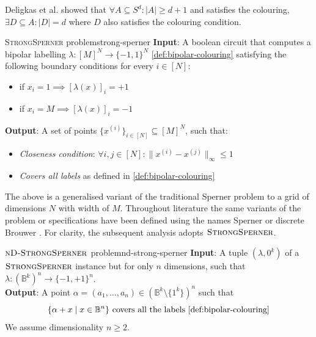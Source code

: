 Deligkas et al. \cite{deligkas_PureCircuitTightInapproximability_2024, deligkas_ConstantInapproximabilityPPA_2022} showed that
$\forall A \subseteq S^d: |A| \geq d+1$ and satisfies the colouring, $\exists D \subseteq A: |D| = d$ where $D$ also satisfies
the colouring condition.

\begin{definitionbox}{\textsc{StrongSperner} problem}{strong-sperner}
    \textbf{Input}: A boolean circuit that computes a bipolar labelling $\lambda: [M]^N \to \{-1, 1\}^N$ \ref{def:bipolar-colouring}
    satisfying the following boundary conditions for every $i \in [N]$:
    \begin{itemize}
        \item if $x_i = 1 \implies [\lambda(x)]_i = +1$
        \item if $x_i = M \implies [\lambda(x)]_i = -1$
    \end{itemize}
    \textbf{Output}: A set of points $\{x^{(i)}\}_{i \in [N]} \subseteq [M]^{N}$, such that:
    \begin{itemize}
        \item \textit{Closeness condition}: $\forall i,j \in [N]: \|x^{(i)} - x^{(j)}\|_{\infty} \leq 1$
        \item \textit{Covers all labels} as defined in \ref{def:bipolar-colouring}
    \end{itemize}
\end{definitionbox}

The above is a generalised variant of the traditional Sperner problem to
a grid of dimensions $N$ with width of $M$. 
Throughout literature the same variants of the problem or specifications
have been defined using the names Sperner or discrete Brouwer \cite{chen_SettlingComplexityComputing_2009, chen_Complexity2DDiscrete_2009, daskalakis_ComplexityComputingNash_2006, deligkas_PureCircuitTightInapproximability_2024}.
For clarity, the subsequent analysis adopts $\textsc{StrongSperner}$.

\begin{definitionbox}{$\textnormal{\textsc{nD-StrongSperner}}$ problem}{nd-strong-sperner}
    \textbf{Input}: A tuple $(\lambda,0^k)$ of a $\textnormal{\textsc{StrongSperner}}$ instance but for only $n$ dimensions, such that
    $\lambda : (\mathbb{B}^k)^n \to \{-1, +1\}^n$.\\
    \textbf{Output}: A point $\alpha = (a_1, \hdots, a_n) \in (\mathbb{B}^k \setminus \{1^k\})^n$ such that
    $$
    \{\alpha + x \mid x \in \mathbb{B}^n\} \text{ covers all the labels \ref{def:bipolar-colouring}}
    $$
    We assume dimensionality $n \geq 2$.
\end{definitionbox}


